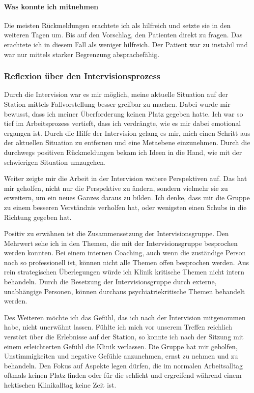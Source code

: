 \paragraph{Was konnte ich mitnehmen}
Die meisten Rückmeldungen erachtete ich als hilfreich und setzte sie in den weiteren Tagen um. Bis auf den Vorschlag, den Patienten direkt zu fragen. Das erachtete ich in diesem Fall als weniger hilfreich. Der Patient war zu instabil und war nur mittels starker Begrenzung absprachefähig.  

\subsubsection{Reflexion über den Intervisionsprozess}
Durch die Intervision war es mir möglich, meine aktuelle Situation auf der Station mittels Fallvorstellung besser greifbar zu machen. Dabei wurde mir bewusst, dass ich meiner Überforderung keinen Platz gegeben hatte. Ich war so tief im Arbeitsprozess vertieft, dass ich verdrängte, wie es mir dabei emotional ergangen ist. Durch die Hilfe der Intervision gelang es mir, mich einen Schritt aus der aktuellen Situation zu entfernen und eine Metaebene einzunehmen. Durch die durchwegs positiven Rückmeldungen bekam ich Ideen in die Hand, wie mit der schwierigen Situation umzugehen. 

Weiter zeigte mir die Arbeit in der Intervision weitere Perspektiven auf. Das hat mir geholfen, nicht nur die Perspektive zu ändern, sondern vielmehr sie zu erweitern, um ein neues Ganzes daraus zu bilden. Ich denke, dass mir die Gruppe zu einem besseren Verständnis verholfen hat, oder wenigsten einen Schubs in die Richtung gegeben hat.

Positiv zu erwähnen ist die Zusammensetzung der Intervisionsgruppe. Den Mehrwert sehe ich in den Themen, die mit der Intervisionsgruppe besprochen werden konnten. Bei einem internen Coaching, auch wenn die zuständige Person noch so professionell ist, können nicht alle Themen offen besprochen werden. Aus rein strategischen Überlegungen würde ich Klinik kritische Themen nicht intern behandeln. Durch die Besetzung der Intervisionsgruppe durch externe, unabhängige Personen, können durchaus psychiatriekritische Themen behandelt werden.

Des Weiteren möchte ich das Gefühl, das ich nach der Intervision mitgenommen habe, nicht unerwähnt lassen. Fühlte ich mich vor unserem Treffen reichlich verstört über die Erlebnisse auf der Station, so konnte ich nach der Sitzung mit einem erleichterten Gefühl die Klinik verlassen. Die Gruppe hat mir geholfen, Unstimmigkeiten und negative Gefühle anzunehmen, ernst zu nehmen und zu behandeln. Den Fokus auf Aspekte legen dürfen, die im normalen Arbeitsalltag oftmals keinen Platz finden oder für die schlicht und ergreifend während einem hektischen Klinikalltag keine Zeit ist. 

